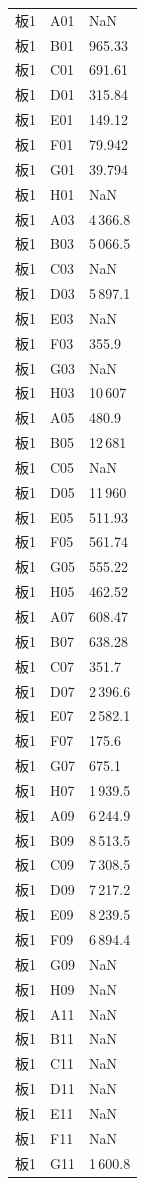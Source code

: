 \documentclass[UTF8,10pt,a4paper,fontset=fandol]{ctexart}
\begin{document}
\begin{minipage}{0.50\linewidth}
\begin{tabular}{@{}lll@{}}
板1 & A01 & NaN\\
板1 & B01 & 965.33\\
板1 & C01 & 691.61\\
板1 & D01 & 315.84\\
板1 & E01 & 149.12\\
板1 & F01 & 79.942\\
板1 & G01 & 39.794\\
板1 & H01 & NaN\\
板1 & A03 & 4\,366.8\\
板1 & B03 & 5\,066.5\\
板1 & C03 & NaN\\
板1 & D03 & 5\,897.1\\
板1 & E03 & NaN\\
板1 & F03 & 355.9\\
板1 & G03 & NaN\\
板1 & H03 & 10\,607\\
板1 & A05 & 480.9\\
板1 & B05 & 12\,681\\
板1 & C05 & NaN\\
板1 & D05 & 11\,960\\
板1 & E05 & 511.93\\
板1 & F05 & 561.74\\
板1 & G05 & 555.22\\
板1 & H05 & 462.52\\
板1 & A07 & 608.47\\
板1 & B07 & 638.28\\
板1 & C07 & 351.7\\
板1 & D07 & 2\,396.6\\
板1 & E07 & 2\,582.1\\
板1 & F07 & 175.6\\
板1 & G07 & 675.1\\
板1 & H07 & 1\,939.5\\
板1 & A09 & 6\,244.9\\
板1 & B09 & 8\,513.5\\
板1 & C09 & 7\,308.5\\
板1 & D09 & 7\,217.2\\
板1 & E09 & 8\,239.5\\
板1 & F09 & 6\,894.4\\
板1 & G09 & NaN\\
板1 & H09 & NaN\\
板1 & A11 & NaN\\
板1 & B11 & NaN\\
板1 & C11 & NaN\\
板1 & D11 & NaN\\
板1 & E11 & NaN\\
板1 & F11 & NaN\\
板1 & G11 & 1\,600.8\\
\end{tabular}


\end{minipage}
\end{document}
